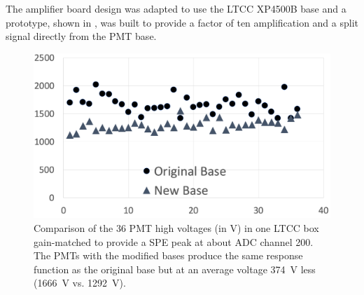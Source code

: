 The amplifier board design was adapted to use the LTCC XP4500B base and a prototype, shown in , was
built to provide a factor of ten amplification and a split signal directly from the PMT base.

\begin{figure}
	\centering
	\includegraphics[width=0.99\columnwidth,keepaspectratio]{img/pmtHVImprovement.png}
	\caption{Comparison of the 36 PMT high voltages (in V) in one LTCC box gain-matched to provide a SPE peak at about
          ADC channel 200. The PMTs with the modified bases produce the same response function as the original base but at
          an average voltage 374~V less (1666~V vs. 1292~V).}
	\label{fig:pmtHVImprovement}
\end{figure}


